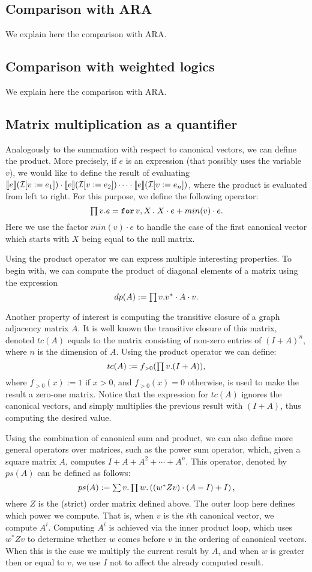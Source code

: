 \medskip

\subsection{Comparison with ARA}

We explain here the comparison with ARA.

\subsection{Comparison with weighted logics}

We explain here the comparison with ARA.


\subsection{Matrix multiplication as a quantifier}

Analogously to the summation with respect to canonical vectors, we can define the product. More precisely, 
if $e$ is an \langfor expression (that possibly uses the variable $v$), we would like to define the result of evaluating $\llbracket e \rrbracket(\mathcal{I}[v := e_1]) \cdot \llbracket e \rrbracket(\mathcal{I}[v := e_2])\cdots \cdot \llbracket e \rrbracket(\mathcal{I}[v := e_n])$, where the product is evaluated from left to right. For this purpose, we define the following operator:
$$\textstyle\prod v. e=\texttt{for}\, v,X \texttt{.}\, X\cdot e + min(v)\cdot e.$$
Here we use the factor $min(v)\cdot e$ to handle the case of the first canonical vector which starts with $X$ being equal to the null matrix. 

Using the product operator we can express multiple interesting properties. To begin with, we can compute the product of diagonal elements of a matrix using the expression $$dp(A) := \textstyle\prod v. v^*\cdot A \cdot v.$$

Another property of interest is computing the transitive closure of a graph adjacency matrix $A$. It is well known the transitive closure of this matrix, denoted $tc(A)$ equals to the matrix consisting of non-zero entries of $(I + A)^n$, where $n$ is the dimension of $A$. Using the product operator we can define:
$$tc(A) := f_{>0}(\textstyle\prod v. (I + A)),$$
where $f_{>0}(x) := 1$ if $x>0$, and $f_{>0}(x) = 0$ otherwise, is used to make the result a zero-one matrix. Notice that the expression for $tc(A)$ ignores the canonical vectors, and simply multiplies the previous result with $(I + A)$, thus computing the desired value.

Using the combination of canonical sum and product, we can also define more general operators over matrices, such as the power sum operator, which, given a square matrix $A$, computes $I + A + A^2 + \cdots + A^n$. This operator, denoted by $ps(A)$ can be defined as follows:
$$ps(A) := \textstyle\sum v.\textstyle\prod w. \left( (w^*Zv)\cdot (A-I) + I\right),$$
where $Z$ is the (strict) order matrix defined above. The outer loop here defines which power we compute. That is, when $v$ is the $i$th canonical vector, we compute $A^i$. Computing $A^i$ is achieved via the inner product loop, which uses $w^*Zv$ to determine whether $w$ comes before $v$ in the ordering of canonical vectors. When this is the case we multiply the current result by $A$, and when $w$ is greater then or equal to $v$, we use $I$ not to affect the already computed result.
